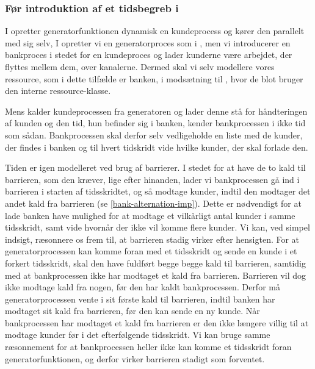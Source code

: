 \subsubsection{Før introduktion af et tidsbegreb i \pycsp}

I \simpy opretter generatorfunktionen dynamisk en kundeprocess og  kører den parallelt med sig selv,
I \pycsp opretter vi en generatorproces  som i \simpy, men vi introducerer en bankproces i stedet for en kundeproces og lader kunderne være arbejdet, der flyttes mellem dem, over kanalerne. Dermed skal vi selv modellere vores ressource, som i dette tilfælde er banken, i modsætning til \simpy, hvor de blot bruger den interne ressource-klasse.

Mens \simpy kalder kundeprocessen fra generatoren og lader denne stå for håndteringen af kunden 
og den tid, hun befinder sig i banken, kender bankprocessen i \pycsp ikke tid som 
sådan. Bankprocessen skal derfor selv vedligeholde en liste med de kunder, der findes i banken og til hvert 
tidskridt vide hvilke kunder, der skal forlade den. 

Tiden er igen modelleret ved brug af barrierer. I 
stedet for at have de to kald til barrieren, som den kræver, lige efter hinanden, lader 
vi bankprocessen gå ind i barrieren i starten af tidsskridtet, og så modtage 
kunder, indtil den modtager det andet kald fra barrieren (se \cref{bank-alternation-imp}). Dette er nødvendigt for at lade banken have 
mulighed for at modtage et vilkårligt antal kunder i samme tidsskridt, samt 
vide hvornår der ikke vil komme flere kunder.  Vi kan, ved simpel indsigt, ræsonnere os frem til, at 
barrieren stadig virker efter hensigten.
For at generatorprocessen kan komme foran med et tidsskridt og sende en kunde i et forkert tidsskridt,
skal den have fuldført begge begge kald til barrieren, samtidig med at bankprocessen ikke 
har modtaget et kald fra barrieren. Barrieren vil dog ikke modtage kald fra 
nogen, før den har  kaldt bankprocessen. Derfor må generatorprocessen vente i 
sit første kald til barrieren, indtil banken har modtaget sit kald fra 
barrieren, før den kan sende en ny kunde.
Når bankprocessen har modtaget et kald fra barrieren er den ikke længere villig 
til at modtage kunder før i det efterfølgende tidsskridt. Vi kan bruge samme 
ræsonnement for at bankprocessen heller ikke kan komme et 
tidsskridt foran generatorfunktionen, og derfor virker barrieren stadigt som 
forventet. 

